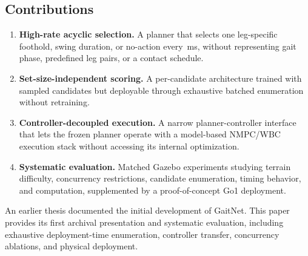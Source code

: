 \subsection{Contributions}

\begin{enumerate}
  \item \textbf{High-rate acyclic selection.} A planner that selects
    one leg-specific foothold, swing duration, or no-action every
    \corlControlTickMs\,ms, without representing gait phase,
    predefined leg pairs, or a contact schedule.
  \item \textbf{Set-size-independent scoring.} A per-candidate
    architecture trained with sampled candidates but deployable
    through exhaustive batched enumeration without retraining.
  \item \textbf{Controller-decoupled execution.} A narrow
    planner-controller interface that lets the frozen planner operate
    with a model-based NMPC/WBC execution stack without accessing its
    internal optimization.
  \item \textbf{Systematic evaluation.} Matched Gazebo experiments
    studying terrain difficulty, concurrency restrictions, candidate
    enumeration, timing behavior, and computation, supplemented by a
    proof-of-concept Go1 deployment.
\end{enumerate}

An earlier thesis \cite{Sullivan2025} documented the initial
development of GaitNet. This paper provides its first archival
presentation and systematic evaluation, including exhaustive
deployment-time enumeration, controller transfer, concurrency
ablations, and physical deployment.
